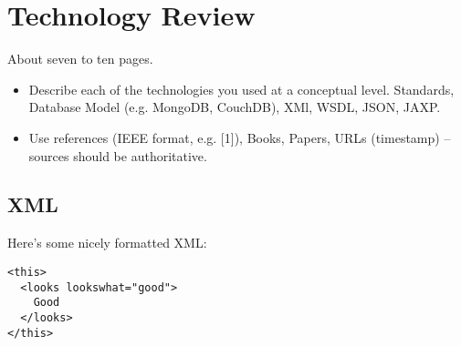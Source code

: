 \chapter{Technology Review}













About seven to ten pages.
\begin{itemize}
\item Describe each of the technologies you used at a conceptual level. Standards, Database Model (e.g. MongoDB, CouchDB), XMl, WSDL, JSON, JAXP.
\item Use references (IEEE format, e.g. [1]), Books, Papers, URLs (timestamp) – sources should be authoritative. 
\end{itemize}

\section{XML}
Here's some nicely formatted XML:
\begin{verbatim}
<this>
  <looks lookswhat="good">
    Good
  </looks>
</this>
\end{verbatim}
